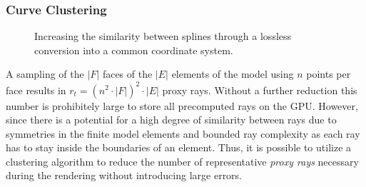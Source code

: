 

\subsubsection{Curve Clustering} \label{contributions:fem:curves}
\begin{figure}
\centering
{}
\caption{Increasing the similarity between splines through a lossless conversion into a common coordinate system.}
\label{contributions:fem:splines}
\end{figure}

A sampling of the $|F|$ faces of the $|E|$ elements of the model using $n$ points per face results in $r_t = \left( n^2 \cdot |F| \right) ^2 \cdot |E|$ proxy rays.  Without a further reduction this number is prohibitely large to store all precomputed rays on the GPU.  However, since there is a potential for a high degree of similarity between rays due to symmetries in the finite model elements and bounded ray complexity as each ray has to stay inside the boundaries of an element.  Thus, it is possible to utilize a clustering algorithm to reduce the number of representative \emph{proxy rays} necessary during the rendering without introducing large errors.


